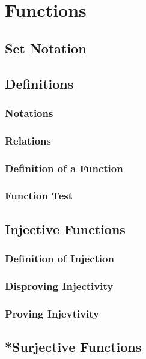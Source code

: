 \documentclass[../main.tex]{subfiles}
\begin{document}
\section{Functions}

\subsection{Set Notation}

\subsection{Definitions}

\subsubsection{Notations}

\subsubsection{Relations}

\subsubsection{Definition of a Function}

\subsubsection{Function Test}

\subsection{Injective Functions}

\subsubsection{Definition of Injection}

\subsubsection{Disproving Injectivity}

\subsubsection{Proving Injevtivity}

\subsection{*Surjective Functions}
\end{document}
